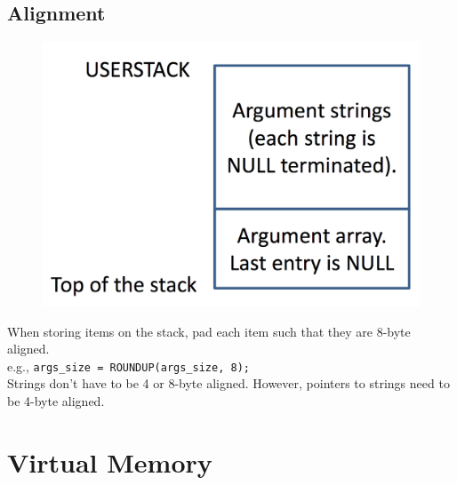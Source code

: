 \documentclass[12pt]{article}
\theoremstyle{plain}
\theoremstyle{definition}
\begin{document}
\subsection{Alignment}
\begin{figure}
  \vspace{-50pt}
  \begin{center}
    \includegraphics[scale=0.3]{pictures/2b_alignment.png}
  \end{center}
\end{figure}
When storing items on the stack, pad each item such that they are 8-byte aligned. \\
e.g., \texttt{args\_size = ROUNDUP(args\_size, 8);} \\

Strings don't have to be 4 or 8-byte aligned. However, pointers to strings need to be 4-byte aligned.


\newpage
\section{Virtual Memory}
\end{document}
